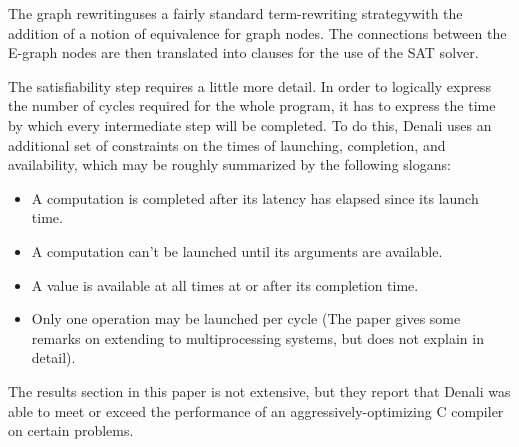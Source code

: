 \documentclass[12pt,twoside]{reedthesis}
\newcommand{\red}[1]{\textcolor{red}{#1}}
\newcommand{\green}[1]{\textcolor{olive}{#1}}
\newcommand{\comment}[2]{\textbf{#1} \textcolor{blue}{#2}}
\begin{document}
            The graph rewriting\footnotemark uses a fairly standard term-rewriting strategy\footnotemark with the addition of a notion of equivalence for graph nodes.
            The connections between the E-graph nodes are then translated into clauses for the use of the SAT solver.


            \footnotetext{
            \green{a}
            \red{TODO:} \comment{graph rewriting}{introduce graph rewriting}
            }
                
                
            The satisfiability step requires a little more detail.
            In order to logically express the number of cycles required for the whole program, it has to express the time by which every intermediate step will be completed.
            To do this, Denali uses an additional set of constraints on the times of launching, completion, and availability, which may be roughly summarized by the following slogans:
            \begin{itemize}
                \item A computation is completed after its latency has elapsed since its launch time.
                \item A computation can't be launched until its arguments are available.
                \item A value is available at all times at or after its completion time.
                \item Only one operation may be launched per cycle (The paper gives some remarks on extending to multiprocessing systems, but does not explain in detail).
            \end{itemize}
                
            The results section in this paper is not extensive, but they report that Denali was able to meet or exceed the performance of an aggressively-optimizing C compiler on certain problems.
\end{document}
